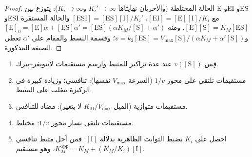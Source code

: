 \begin{proof}
الحالة المختلطة (والأخريان نهايتاها $K_i' \to \infty$ و$K_i \to \infty$): يتوزع 
بين E وEI وES وESI مع $[\mathrm{EI}] = [\mathrm E][\mathrm I]/K_i$، $[\mathrm{ESI}] = [\mathrm{ES}][\mathrm I]/K_i'$
والحالة المستقرة $[\mathrm E][\mathrm S] = K_M[\mathrm{ES}]$. ومنه $[\mathrm E]_0 = [\mathrm E]\alpha + [\mathrm{ES}]\alpha' =
[\mathrm{ES}](\alpha K_M/[\mathrm S] + \alpha')$ و$v = k_2[\mathrm{ES}] = V_{\max}[\mathrm S]/(\alpha K_M + \alpha'[\mathrm S])$؛ وقسمة البسط
والمقام على $\alpha'$ تعطي الصيغة المذكورة.
\end{proof}

\begin{method}\label{met:b3:complex-kinetics:inhibition-type}
\begin{enumerate}
  \item قِس $v([\mathrm S])$ عند عدة تراكيز للمثبط وارسم
        مستقيمات لاينويفر--بيرك.
  \item مستقيمات تلتقي على محور $1/v$ (السرعة $V_{\max}$ نفسها): تنافسي؛ وزيادة كبيرة
        في الركيزة تتغلب على المثبط.
  \item مستقيمات متوازية (الميل $K_M/V_{\max}$ لا يتغير): مضاد للتنافس.
  \item مستقيمات تلتقي يسار محور $1/v$: مختلط.
  \item احصل على $K_i$ بضبط الثوابت الظاهرية بدلالة $[\mathrm I]$: فمن أجل
        مثبط تنافسي $K_M^{\mathrm{app}} = K_M + (K_M/K_i)[\mathrm I]$، وهو مستقيم.
\end{enumerate}
\end{method}

